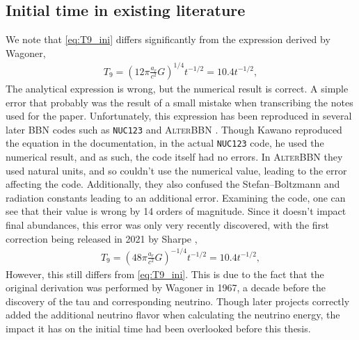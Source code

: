 \subsection{Initial time in existing literature}
We note that \eqref{eq:T9_ini} differs significantly from the expression derived by Wagoner\cite{Wagoner67},
\begin{align}
    T_9=(12\pi\frac{a_r}{c^2}G)^{1/4}t^{-1/2}=10.4t^{-1/2},
\end{align}
The analytical expression is wrong, but the numerical result is correct. A simple error that probably was the result of a small mistake when transcribing the notes used for the paper. Unfortunately, this expression has been reproduced in several later BBN codes such as \texttt{NUC123}\cite{Kawano} and \textsc{AlterBBN} \cite{AlterBBN}. Though Kawano reproduced the equation in the documentation, in the actual \texttt{NUC123} code, he used the numerical result, and as such, the code itself had no errors. In \textsc{AlterBBN} they used natural units, and so couldn't use the numerical value, leading to the error affecting the code. Additionally, they also confused the Stefan–Boltzmann and radiation constants leading to an additional error. Examining the code, one can see that their value is wrong by 14 orders of magnitude. %
Since it doesn't impact final abundances, this error was only very recently discovered, with the first correction being released in 2021 by Sharpe \cite{sharpe2021big},
\begin{align}
    T_9=(48\pi\frac{a_r}{c^2}G)^{-1/4}t^{-1/2}=10.4t^{-1/2},
\end{align}
However, this still differs from \eqref{eq:T9_ini}. This is due to the fact that the original derivation was performed by Wagoner in 1967, a decade before the discovery of the tau and corresponding neutrino. Though later projects correctly added the additional neutrino flavor when calculating the neutrino energy, the impact it has on the initial time had been overlooked before this thesis. 


